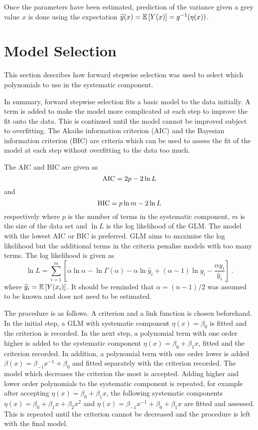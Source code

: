 Once the parameters have been estimated, prediction of the variance given a grey value $x$ is done using the expectation $\widehat{y}(x) = \operatorname{\mathbb{E}}\left[Y(x)\right] = g^{-1}(\eta(x))$.

\section{Model Selection}

This section describes how forward stepwise selection \citep{friedman2001elements} was used to select which polynomials to use in the systematic component.

In summary, forward stepwise selection fits a basic model to the data initially. A term is added to make the model more complicated at each step to improve the fit onto the data. This is continued until the model cannot be improved subject to overfitting. The Akaike information criterion (AIC) \citep{friedman2001elements} and the Bayesian information criterion (BIC) \citep{friedman2001elements} are criteria which can be used to assess the fit of the model at each step without overfitting to the data too much.

The AIC and BIC are given as
\begin{equation}
\mathrm{AIC} = 2p-2\ln L
\end{equation}
and
\begin{equation}
\mathrm{BIC} = p\ln m - 2\ln L
\end{equation}
respectively where $p$ is the number of terms in the systematic component, $m$ is the size of the data set and $\ln L$ is the log likelihood of the GLM. The model with the lowest AIC or BIC is preferred. GLM aims to maximise the log likelihood but the additional terms in the criteria penalise models with too many terms. The log likelihood is given as
\begin{equation}
  \ln L = \sum_{i=1}^m \left[
    \alpha\ln\alpha
    -\ln\Gamma(\alpha)
    -\alpha\ln \widehat{y}_i
    +(\alpha-1)\ln y_i
    -\frac{\alpha y_i}{\widehat{y}_i}
  \right]
  \ .
\end{equation}
where $\widehat{y}_i=\operatorname{\mathbb{E}}\left[Y(x_i)\right]$. It should be reminded that $\alpha=(n-1)/2$ was assumed to be known and does not need to be estimated.

The procedure is as follows. A criterion and a link function is chosen beforehand. In the initial step, a GLM with systematic component $\eta(x)=\beta_0$ is fitted and the criterion is recorded. In the next step, a polynomial term with one order higher is added to the systematic component $\eta(x)=\beta_0+\beta_1 x$, fitted and the criterion recorded. In addition, a polynomial term with one order lower is added $\beta(x)=\beta_{-1}x^{-1}+\beta_0$ and fitted separately with the criterion recorded. The model which decreases the criterion the most is accepted. Adding higher and lower order polynomials to the systematic component is repeated, for example after accepting $\eta(x)=\beta_0+\beta_1 x$, the following systematic components $\eta(x)=\beta_0+\beta_1 x+\beta_2x^2$ and $\eta(x)=\beta_{-1}x^{-1}+\beta_0+\beta_1 x$ are fitted and assessed. This is repeated until the criterion cannot be decreased and the procedure is left with the final model.

